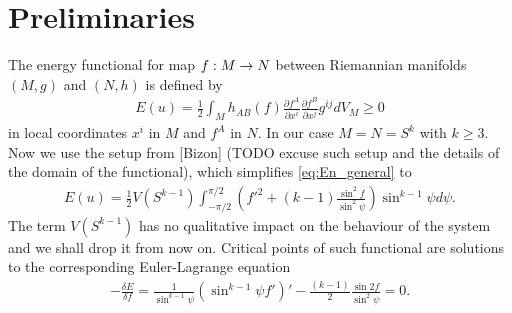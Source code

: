 \section*{Preliminaries}


The energy functional for map $f:M\rightarrow N$ between Riemannian manifolds
$(M,g)$ and $(N,h)$ is defined by
\begin{align}\label{eq:En_general}
  E(u)=\frac{1}{2}\int_M h_{AB}(f)\frac{\partial f^A}{\partial
    x^i}\frac{\partial f^B}{\partial x^j}g^{ij}dV_M\ge0
\end{align}
in local coordinates $x^i$ in $M$ and $f^A$ in $N$. In our case
$M=N=S^k$ with $k\ge3$. Now we use the setup from [Bizon] (TODO excuse
such setup and the details of the domain of the functional), which
simplifies \eqref{eq:En_general} to
\begin{align}
  \label{eq:En_Sk}
  E(u)=\frac{1}{2} V(S^{k-1})\int_{-\pi/2}^{\pi/2}
  \left(f'^2+(k-1)\frac{\sin^2f}{\sin^2\psi}\right) \sin^{k-1}\psi
  d\psi.
\end{align}
The term $V(S^{k-1})$ has no qualitative impact on the behaviour of
the system and we shall drop it from now on. Critical points of such
functional are solutions to the corresponding Euler-Lagrange equation
\begin{align}
  \label{eq:f_psi_EL}
  -\frac{\delta E}{\delta f}=\frac{1}{\sin^{k-1}\psi}\left(\sin^{k-1}\psi
    f'\right)'-\frac{(k-1)}{2}\frac{\sin2f}{\sin^2\psi}=0.
\end{align}

